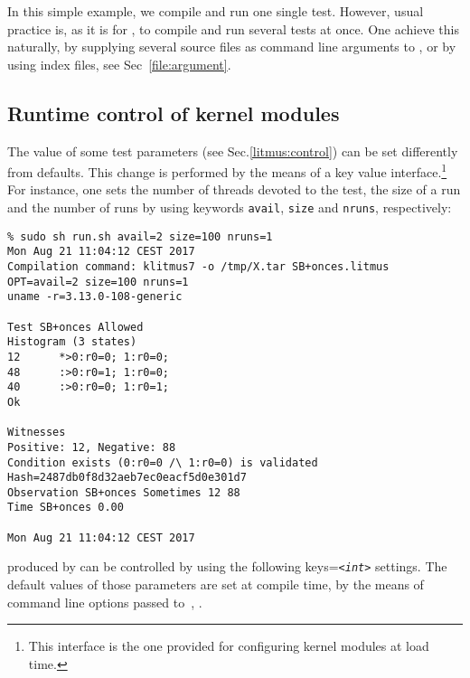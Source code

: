 In this simple example, we compile and run one single test.
However, usual practice is, as it is for \litmus{}, to compile and run
several tests at once.
One achieve this naturally, by supplying several source files as command
line arguments to \klitmus,
or by using index files, see Sec~\ref{file:argument}.

\subsection{Runtime control of kernel modules}
The value of some test parameters
(see Sec.\ref{litmus:control}) can be set differently from defaults.
This change is performed by the means
of a key value interface.\footnote{This interface is the one provided for
configuring kernel modules at load time.}
For instance, one sets the number of threads devoted
to the test, the size of a run
and the number of runs by using keywords \texttt{avail},
\texttt{size} and \texttt{nruns}, respectively:
\begin{verbatim}
% sudo sh run.sh avail=2 size=100 nruns=1
Mon Aug 21 11:04:12 CEST 2017
Compilation command: klitmus7 -o /tmp/X.tar SB+onces.litmus
OPT=avail=2 size=100 nruns=1
uname -r=3.13.0-108-generic

Test SB+onces Allowed
Histogram (3 states)
12      *>0:r0=0; 1:r0=0;
48      :>0:r0=1; 1:r0=0;
40      :>0:r0=0; 1:r0=1;
Ok

Witnesses
Positive: 12, Negative: 88
Condition exists (0:r0=0 /\ 1:r0=0) is validated
Hash=2487db0f8d32aeb7ec0eacf5d0e301d7
Observation SB+onces Sometimes 12 88
Time SB+onces 0.00

Mon Aug 21 11:04:12 CEST 2017
\end{verbatim}

produced by \klitmus{} can be controlled by
using the following keys=\texttt{\em{<int>}} settings.
The default values of those parameters are set at compile time,
by the means of command line options passed to~\klitmus,
.

